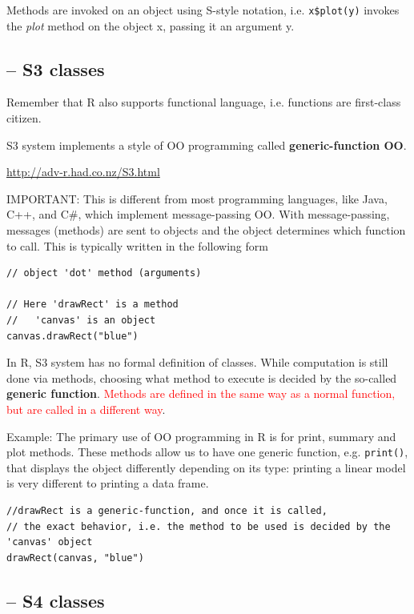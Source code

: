 Methods are invoked on an object using S-style notation, i.e. \verb|x$plot(y)|
invokes the {\it plot} method on the object x, passing it an argument y.


\subsection{-- S3 classes}
\label{sec:S3-classes}

Remember that R also supports functional language, i.e. functions are first-class
citizen.

S3 system implements a style of OO programming called {\bf generic-function OO}.

\url{http://adv-r.had.co.nz/S3.html}
 
IMPORTANT: This is different from most programming languages, like Java, C++,
and C\#, which implement message-passing OO. With message-passing, messages
(methods) are sent to objects and the object determines which function to call. This
is typically written in the following form
\begin{verbatim}
// object 'dot' method (arguments)

// Here 'drawRect' is a method
//   'canvas' is an object
canvas.drawRect("blue")
\end{verbatim}

In R, S3 system  has no formal definition of classes. While computation is still
done via methods, choosing what method to execute is decided by the so-called
{\bf generic function}.
\textcolor{red}{Methods are defined in the same way as a normal function, but are called in a
different way}.

Example: The primary use of OO programming in R is for print, summary and plot
methods. These methods allow us to have one generic function, e.g. \verb!print()!, that
displays the object differently depending on its type: printing a linear model
is very different to printing a data frame.


\begin{verbatim}
//drawRect is a generic-function, and once it is called, 
// the exact behavior, i.e. the method to be used is decided by the 'canvas' object
drawRect(canvas, "blue")
\end{verbatim}




\subsection{-- S4 classes}
\label{sec:S4-classes}


